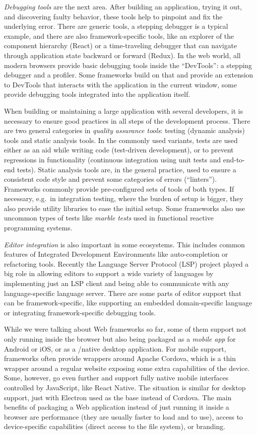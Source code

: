 \documentclass[english,zadani,odsaz]{fitthesis}
\begin{document}
\emph{Debugging tools} are the next area. After building an application, trying it out,
and discovering faulty behavior, these tools help to pinpoint and fix the
underlying error. There are generic tools, a stepping debugger is a typical
example, and there are also framework-specific tools, like an explorer of the
component hierarchy (React) or a time-traveling debugger that can navigate
through application state backward or forward (Redux). In the web world, all
modern browsers provide basic debugging tools inside the ``DevTools'': a stepping
debugger and a profiler. Some frameworks build on that and provide an extension
to DevTools that interacts with the application in the current window, some
provide debugging tools integrated into the application itself.

When building or maintaining a large application with several developers, it is
necessary to ensure good practices in all steps of the development
process. There are two general categories in \emph{quality assurance tools}: testing
(dynamic analysis) tools and static analysis tools. In the commonly used
variants, tests are used either as an aid while writing code (test-driven
development), or to prevent regressions in functionality (continuous integration
using unit tests and end-to-end tests). Static analysis tools are, in the
general practice, used to ensure a consistent code style and prevent some
categories of errors (``linters''). Frameworks commonly provide pre-configured
sets of tools of both types. If necessary, e.g.~in integration testing, where the
burden of setup is bigger, they also provide utility libraries to ease the
initial setup. Some frameworks also use uncommon types of tests like \emph{marble
tests} used in functional reactive programming systems.

\emph{Editor integration} is also important in some ecosystems. This includes common
features of Integrated Development Environments like auto-completion or
refactoring tools. Recently the Language Server Protocol (LSP) \cite{lsp} project
played a big role in allowing editors to support a wide variety of languages by
implementing just an LSP client and being able to communicate with any
language-specific language server. There are some parts of editor support that
can be framework-specific, like supporting an embedded domain-specific language
or integrating framework-specific debugging tools.

While we were talking about Web frameworks so far, some of them support not only
running inside the browser but also being packaged as a \emph{mobile app} for Android
or iOS, or as a /native desktop application. For mobile support, frameworks
often provide wrappers around Apache Cordova, which is a thin wrapper around a
regular website exposing some extra capabilities of the device. Some, however,
go even further and support fully native mobile interfaces controlled by
JavaScript, like React Native. The situation is similar for desktop support,
just with Electron used as the base instead of Cordova. The main benefits of
packaging a Web application instead of just running it inside a browser are
performance (they are usually faster to load and to use), access to
device-specific capabilities (direct access to the file system), or branding.
\end{document}
